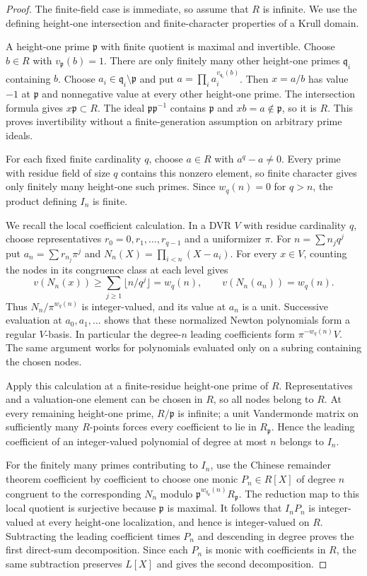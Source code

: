 \begin{proof}
The finite-field case is immediate, so assume that $R$ is infinite.
We use the defining height-one intersection and finite-character
properties of a Krull domain.

A height-one prime $\mathfrak p$ with finite quotient is maximal and
invertible. Choose $b\in R$ with $v_{\mathfrak p}(b)=1$. There are
only finitely many other height-one primes $\mathfrak q_i$ containing
$b$. Choose $a_i\in\mathfrak q_i\setminus\mathfrak p$ and put
$a=\prod_i a_i^{v_{\mathfrak q_i}(b)}$. Then $x=a/b$ has value $-1$
at $\mathfrak p$ and nonnegative value at every other height-one
prime. The intersection formula gives $x\mathfrak p\subset R$.
The ideal $\mathfrak p\mathfrak p^{-1}$ contains $\mathfrak p$ and
$xb=a\notin\mathfrak p$, so it is $R$. This proves invertibility
without a finite-generation assumption on arbitrary prime ideals.

For each fixed finite cardinality $q$, choose $a\in R$ with
$a^q-a\ne0$. Every prime with residue field of size $q$ contains
this nonzero element, so finite character gives only finitely many
height-one such primes. Since $w_q(n)=0$ for $q>n$, the product
defining $I_n$ is finite.

We recall the local coefficient calculation. In a DVR $V$ with
residue cardinality $q$, choose representatives $r_0=0,r_1,\ldots,r_{q-1}$
and a uniformizer $\pi$. For $n=\sum n_jq^j$ put
$a_n=\sum r_{n_j}\pi^j$ and $N_n(X)=\prod_{i<n}(X-a_i)$.
For every $x\in V$, counting the nodes in its congruence class at
each level gives
\[
 v(N_n(x))\ge\sum_{j\ge1}\lfloor n/q^j\rfloor=w_q(n),
 \qquad v(N_n(a_n))=w_q(n).
\]
Thus $N_n/\pi^{w_q(n)}$ is integer-valued, and its value at $a_n$
is a unit. Successive evaluation at $a_0,a_1,\ldots$ shows that
these normalized Newton polynomials form a regular $V$-basis.
In particular the degree-$n$ leading coefficients form
$\pi^{-w_q(n)}V$. The same argument works for polynomials evaluated
only on a subring containing the chosen nodes.

Apply this calculation at a finite-residue height-one prime of $R$.
Representatives and a valuation-one element can be chosen in $R$,
so all nodes belong to $R$. At every remaining height-one prime,
$R/\mathfrak p$ is infinite; a unit Vandermonde matrix on sufficiently
many $R$-points forces every coefficient to lie in $R_{\mathfrak p}$.
Hence the leading coefficient of an integer-valued polynomial of
degree at most $n$ belongs to $I_n$.

For the finitely many primes contributing to $I_n$, use the Chinese
remainder theorem coefficient by coefficient to choose one monic
$P_n\in R[X]$ of degree $n$ congruent to the corresponding $N_n$
modulo $\mathfrak p^{w_{q_{\mathfrak p}}(n)}R_{\mathfrak p}$.
The reduction map to this local quotient is surjective because
$\mathfrak p$ is maximal. It follows that $I_nP_n$ is integer-valued
at every height-one localization, and hence is integer-valued on $R$.
Subtracting the leading coefficient times $P_n$ and descending in
degree proves the first direct-sum decomposition. Since each $P_n$
is monic with coefficients in $R$, the same subtraction preserves
$L[X]$ and gives the second decomposition.


\end{proof}

